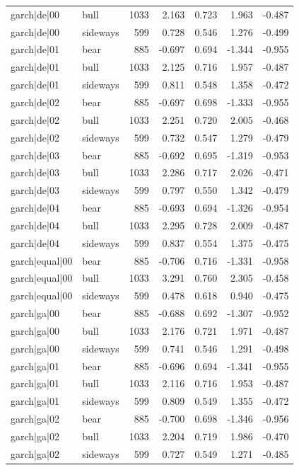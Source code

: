 \begin{table}
\begin{tabular}{llrrrrr}
garch|de|00 & bull & 1033 & 2.163 & 0.723 & 1.963 & -0.487 \\
garch|de|00 & sideways & 599 & 0.728 & 0.546 & 1.276 & -0.499 \\
garch|de|01 & bear & 885 & -0.697 & 0.694 & -1.344 & -0.955 \\
garch|de|01 & bull & 1033 & 2.125 & 0.716 & 1.957 & -0.487 \\
garch|de|01 & sideways & 599 & 0.811 & 0.548 & 1.358 & -0.472 \\
garch|de|02 & bear & 885 & -0.697 & 0.698 & -1.333 & -0.955 \\
garch|de|02 & bull & 1033 & 2.251 & 0.720 & 2.005 & -0.468 \\
garch|de|02 & sideways & 599 & 0.732 & 0.547 & 1.279 & -0.479 \\
garch|de|03 & bear & 885 & -0.692 & 0.695 & -1.319 & -0.953 \\
garch|de|03 & bull & 1033 & 2.286 & 0.717 & 2.026 & -0.471 \\
garch|de|03 & sideways & 599 & 0.797 & 0.550 & 1.342 & -0.479 \\
garch|de|04 & bear & 885 & -0.693 & 0.694 & -1.326 & -0.954 \\
garch|de|04 & bull & 1033 & 2.295 & 0.728 & 2.009 & -0.487 \\
garch|de|04 & sideways & 599 & 0.837 & 0.554 & 1.375 & -0.475 \\
garch|equal|00 & bear & 885 & -0.706 & 0.716 & -1.331 & -0.958 \\
garch|equal|00 & bull & 1033 & 3.291 & 0.760 & 2.305 & -0.458 \\
garch|equal|00 & sideways & 599 & 0.478 & 0.618 & 0.940 & -0.475 \\
garch|ga|00 & bear & 885 & -0.688 & 0.692 & -1.307 & -0.952 \\
garch|ga|00 & bull & 1033 & 2.176 & 0.721 & 1.971 & -0.487 \\
garch|ga|00 & sideways & 599 & 0.741 & 0.546 & 1.291 & -0.498 \\
garch|ga|01 & bear & 885 & -0.696 & 0.694 & -1.341 & -0.955 \\
garch|ga|01 & bull & 1033 & 2.116 & 0.716 & 1.953 & -0.487 \\
garch|ga|01 & sideways & 599 & 0.809 & 0.549 & 1.355 & -0.472 \\
garch|ga|02 & bear & 885 & -0.700 & 0.698 & -1.346 & -0.956 \\
garch|ga|02 & bull & 1033 & 2.204 & 0.719 & 1.986 & -0.470 \\
garch|ga|02 & sideways & 599 & 0.727 & 0.549 & 1.271 & -0.485 \\

\end{tabular}
\end{table}
